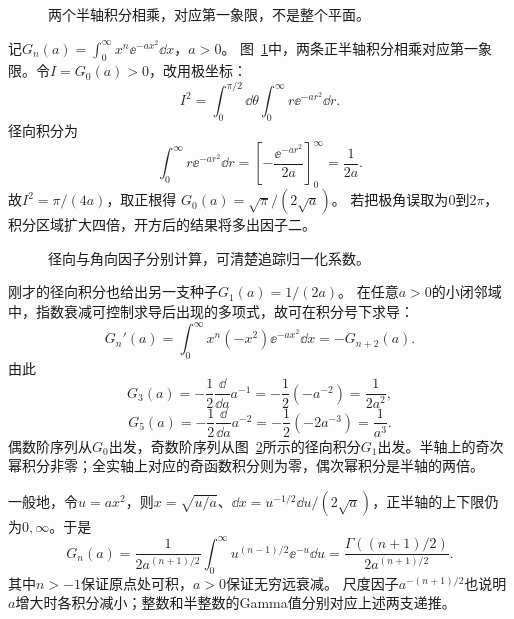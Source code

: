 \begin{figure}[H]\centering
{}
\caption{两个半轴积分相乘，对应第一象限，不是整个平面。}\label{fig:c4-e10-q}
\end{figure}
\begin{solution}
记$G_n(a)=\int_0^\infty x^n\ee^{-ax^2}\dd x$，$a>0$。
图~\ref{fig:c4-e10-q}中，两条正半轴积分相乘对应第一象限。令$I=G_0(a)>0$，改用极坐标：
\[
 I^2=\int_0^{\pi/2}\dd\theta
 \int_0^\infty r\ee^{-ar^2}\dd r.
\]
径向积分为
\[
 \int_0^\infty r\ee^{-ar^2}\dd r
 =\left[-\frac{\ee^{-ar^2}}{2a}\right]_0^\infty
 =\frac1{2a}.
\]
故$I^2=\pi/(4a)$，取正根得
$\boxed{G_0(a)=\sqrt\pi/(2\sqrt a)}$。
若把极角误取为$0$到$2\pi$，积分区域扩大四倍，开方后的结果将多出因子二。
\begin{figure}[H]\centering
{}
\caption{径向与角向因子分别计算，可清楚追踪归一化系数。}\label{fig:c4-e10-s}
\end{figure}
刚才的径向积分也给出另一支种子$G_1(a)=1/(2a)$。
在任意$a>0$的小闭邻域中，指数衰减可控制求导后出现的多项式，故可在积分号下求导：
\[G_n'(a)=\int_0^\infty x^n(-x^2)\ee^{-ax^2}\dd x=-G_{n+2}(a).\]
由此
\[G_3(a)=-\frac12\frac{\dd}{\dd a}a^{-1}
=-\frac12(-a^{-2})=\boxed{\frac1{2a^2}},\]
\[G_5(a)=-\frac12\frac{\dd}{\dd a}a^{-2}
=-\frac12(-2a^{-3})=\boxed{\frac1{a^3}}.\]
偶数阶序列从$G_0$出发，奇数阶序列从图~\ref{fig:c4-e10-s}所示的径向积分$G_1$出发。半轴上的奇次幂积分非零；全实轴上对应的奇函数积分则为零，偶次幂积分是半轴的两倍。

一般地，令$u=ax^2$，则$x=\sqrt{u/a}$、$\dd x=u^{-1/2}\dd u/(2\sqrt a)$，正半轴的上下限仍为$0,\infty$。于是
\[
 G_n(a)=\frac1{2a^{(n+1)/2}}
 \int_0^\infty u^{(n-1)/2}\ee^{-u}\dd u
 =\frac{\Gamma((n+1)/2)}{2a^{(n+1)/2}}.
\]
其中$n>-1$保证原点处可积，$a>0$保证无穷远衰减。
尺度因子$a^{-(n+1)/2}$也说明$a$增大时各积分减小；整数和半整数的Gamma值分别对应上述两支递推。
\end{solution}

